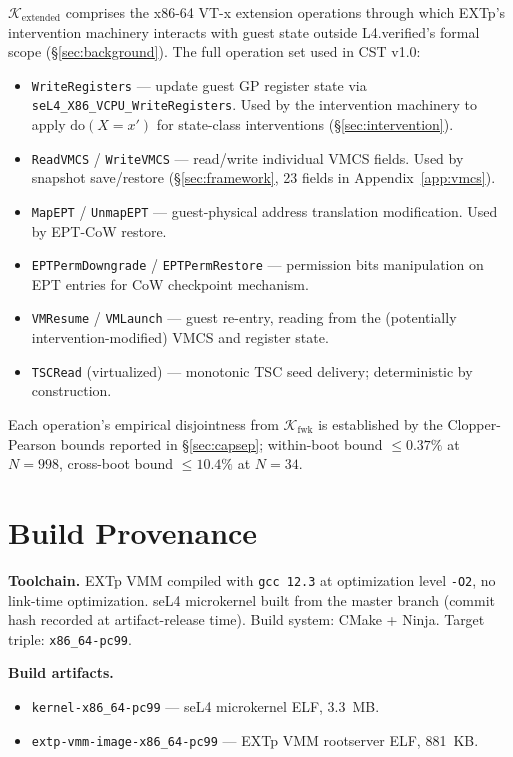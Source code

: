 \documentclass[conference]{IEEEtran}
\newcommand{\Kextended}{\mathcal{K}_\text{extended}}
\newcommand{\Kfwk}{\mathcal{K}_\text{fwk}}
\newcommand{\dox}[1]{\text{do}(X{=}#1)}
\begin{document}
$\Kextended$ comprises the x86-64 VT-x extension operations
through which EXTp's intervention machinery interacts with guest
state outside L4.verified's formal scope (\S\ref{sec:background}).
The full operation set used in CST v1.0:

\begin{itemize}[itemsep=2pt,topsep=2pt,leftmargin=*]
\item \texttt{WriteRegisters} --- update guest GP register state
  via \texttt{seL4\_X86\_VCPU\_WriteRegisters}. Used by the
  intervention machinery to apply $\dox{x'}$ for state-class
  interventions (\S\ref{sec:intervention}).
\item \texttt{ReadVMCS} / \texttt{WriteVMCS} --- read/write
  individual VMCS fields. Used by snapshot save/restore
  (\S\ref{sec:framework}, 23 fields in Appendix~\ref{app:vmcs}).
\item \texttt{MapEPT} / \texttt{UnmapEPT} --- guest-physical
  address translation modification. Used by EPT-CoW restore.
\item \texttt{EPTPermDowngrade} / \texttt{EPTPermRestore} ---
  permission bits manipulation on EPT entries for CoW
  checkpoint mechanism.
\item \texttt{VMResume} / \texttt{VMLaunch} --- guest re-entry,
  reading from the (potentially intervention-modified) VMCS and
  register state.
\item \texttt{TSCRead} (virtualized) --- monotonic TSC seed
  delivery; deterministic by construction.
\end{itemize}

Each operation's empirical disjointness from $\Kfwk$ is established
by the Clopper-Pearson bounds reported in \S\ref{sec:capsep};
within-boot bound $\leq 0.37\%$ at $N{=}998$, cross-boot bound
$\leq 10.4\%$ at $N{=}34$.

\section{Build Provenance}\label{app:build}

\textbf{Toolchain.} EXTp VMM compiled with \texttt{gcc 12.3} at
optimization level \texttt{-O2}, no link-time optimization.
seL4 microkernel built from the master branch (commit hash
recorded at artifact-release time). Build system: CMake + Ninja. Target triple:
\texttt{x86\_64-pc99}.

\textbf{Build artifacts.}
\begin{itemize}[itemsep=2pt,topsep=2pt,leftmargin=*]
\item \texttt{kernel-x86\_64-pc99} --- seL4 microkernel ELF, 3.3~MB.
\item \texttt{extp-vmm-image-x86\_64-pc99} --- EXTp VMM rootserver
  ELF, 881~KB.
\end{itemize}
\end{document}
